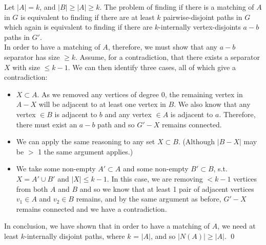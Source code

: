 \linebreak 
Let $|A| = k$, and $|B| \geq |A| \geq k$. The problem of finding if there is a matching of $A$ in $G$ is equivalent to finding if there are at least $k$ pairwise-disjoint paths in $G$ which again is equivalent to finding if there are $k$-internally vertex-disjoints $a-b$ paths in $G'$. \\
\linebreak 
In order to have a matching of $A$, therefore, we must show that any $a-b$ separator has size $\geq k$. Assume, for a contradiction, that there exists a separator $X$ with size $\leq k-1$. We can then identify three cases, all of which give a contradiction: 
\begin{itemize}
    \item $X \subset A$. As we removed any vertices of degree 0, the remaining vertex in $A-X$ will be adjacent to at least one vertex in $B$. We also know that any vertex $\in B$ is adjacent to $b$ and any vertex $\in A$ is adjacent to $a$. Therefore, there must exist an $a-b$ path and so $G'-X$ remains connected. 
    \item We can apply the same reasoning to any set $X \subset B$. (Although $|B-X|$ may be $>$ 1 the same argument applies.)
    \item We take some non-empty $A' \subset A$ and some non-empty $B' \subset B$, s.t. $X = A' \cup B'$ and $|X| \leq k-1$. In this case, we are removing $< k-1$ vertices from both $A$ and $B$ and so we know that at least 1 pair of adjacent vertices $v_1 \in A$ and $v_2 \in B$ remains, and by the same argument as before, $G'-X$ remains connected and we have a contradiction.
\end{itemize}
In conclusion, we have shown that in order to have a matching of $A$, we need at least $k$-internally disjoint paths, where $k$ = $|A|$, and so $|N(A)| \geq |A|$. \qed